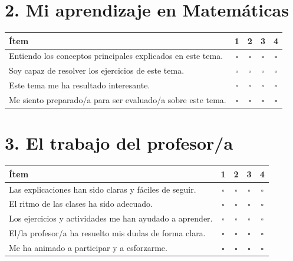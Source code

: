 \documentclass[12pt,a4paper]{article}
\begin{document}
\section*{2. Mi aprendizaje en Matemáticas}

\begin{tabularx}{\textwidth}{Xcccc}
\toprule
\rowcolor{headerblue}
\textbf{Ítem} & \textbf{1} & \textbf{2} & \textbf{3} & \textbf{4} \\
\midrule
Entiendo los conceptos principales explicados en este tema. & $\square$ & $\square$ & $\square$ & $\square$ \\[5pt]
Soy capaz de resolver los ejercicios de este tema. & $\square$ & $\square$ & $\square$ & $\square$ \\[5pt]
Este tema me ha resultado interesante. & $\square$ & $\square$ & $\square$ & $\square$ \\[5pt]
Me siento preparado/a para ser evaluado/a sobre este tema. & $\square$ & $\square$ & $\square$ & $\square$ \\
\bottomrule
\end{tabularx}

\vspace{1em}

\section*{3. El trabajo del profesor/a}

\begin{tabularx}{\textwidth}{Xcccc}
\toprule
\rowcolor{headerblue}
\textbf{Ítem} & \textbf{1} & \textbf{2} & \textbf{3} & \textbf{4} \\
\midrule
Las explicaciones han sido claras y fáciles de seguir. & $\square$ & $\square$ & $\square$ & $\square$ \\[5pt]
El ritmo de las clases ha sido adecuado. & $\square$ & $\square$ & $\square$ & $\square$ \\[5pt]
Los ejercicios y actividades me han ayudado a aprender. & $\square$ & $\square$ & $\square$ & $\square$ \\[5pt]
El/la profesor/a ha resuelto mis dudas de forma clara. & $\square$ & $\square$ & $\square$ & $\square$ \\[5pt]
Me ha animado a participar y a esforzarme. & $\square$ & $\square$ & $\square$ & $\square$ \\
\bottomrule
\end{tabularx}
\end{document}
